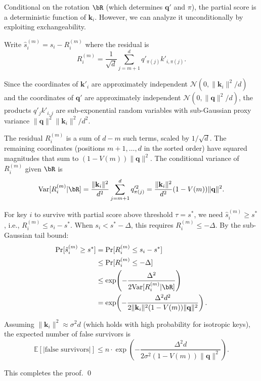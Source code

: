 \documentclass[10pt,twocolumn]{article}
\theoremstyle{definition}
\newcommand{\E}{\mathbb{E}}
\newcommand{\Var}{\mathrm{Var}}
\newcommand{\calN}{\mathcal{N}}
\newcommand{\bq}{\mathbf{q}}
\newcommand{\bk}{\mathbf{k}}
\begin{document}
Conditional on the rotation $\bR$ (which determines $\bq'$ and $\pi$), the
partial score is a deterministic function of $\bk_i$.  However, we can analyze
it unconditionally by exploiting exchangeability.

Write $\hat{s}_i^{(m)} = s_i - R_i^{(m)}$ where the residual is
\begin{equation}
  R_i^{(m)} = \frac{1}{\sqrt{d}} \sum_{j=m+1}^{d} q'_{\pi(j)} k'_{i,\pi(j)}.
\end{equation}

Since the coordinates of $\bk'_i$ are approximately independent
$\calN(0, \|\bk_i\|^2/d)$ and the coordinates of $\bq'$ are approximately
independent $\calN(0, \|\bq\|^2/d)$, the products $q'_j k'_{i,j}$ are
sub-exponential random variables with sub-Gaussian proxy variance
$\|\bq\|^2 \|\bk_i\|^2 / d^2$.

The residual $R_i^{(m)}$ is a sum of $d - m$ such terms, scaled by $1/\sqrt{d}$.
The remaining coordinates (positions $m+1, \ldots, d$ in the sorted order) have
squared magnitudes that sum to $(1 - V(m)) \|\bq\|^2$.  The conditional variance
of $R_i^{(m)}$ given $\bR$ is
\begin{equation}
  \Var[R_i^{(m)} | \bR]
    = \frac{\|\bk_i\|^2}{d^2} \sum_{j=m+1}^{d} q'^2_{\pi(j)}
    = \frac{\|\bk_i\|^2}{d^2} (1 - V(m)) \|\bq\|^2.
\end{equation}

For key $i$ to survive with partial score above threshold $\tau = s^*$, we need
$\hat{s}_i^{(m)} \geq s^*$, i.e., $R_i^{(m)} \leq s_i - s^*$.  When
$s_i < s^* - \Delta$, this requires $R_i^{(m)} \leq -\Delta$.  By the
sub-Gaussian tail bound:
\begin{align}
  \Pr[\hat{s}_i^{(m)} \geq s^*]
    &= \Pr[R_i^{(m)} \leq s_i - s^*] \nonumber \\
    &\leq \Pr[R_i^{(m)} \leq -\Delta] \nonumber \\
    &\leq \exp\!\left(-\frac{\Delta^2}{2 \Var[R_i^{(m)} | \bR]}\right) \nonumber \\
    &= \exp\!\left(-\frac{\Delta^2 d^2}{2\|\bk_i\|^2 (1-V(m)) \|\bq\|^2}\right).
\end{align}

Assuming $\|\bk_i\|^2 \approx \sigma^2 d$ (which holds with high probability
for isotropic keys), the expected number of false survivors is
\begin{equation}
  \E[|\text{false survivors}|]
    \leq n \cdot \exp\!\left(-\frac{\Delta^2 d}{2\sigma^2 (1 - V(m)) \|\bq\|^2}\right).
\end{equation}

This completes the proof.  \qed
\end{document}
